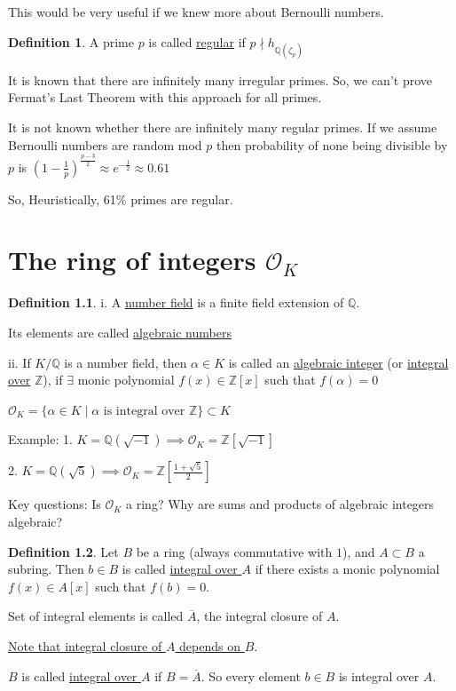 \documentclass[openany]{amsbook}
\numberwithin{section}{chapter}
\theoremstyle{definition}
\newtheorem*{definition}{Definition}
\begin{document}
This would be very useful if we knew more about Bernoulli numbers.

\begin{definition}
    A prime \(p\) is called \underline{regular} if \(p \nmid h_{\mathbb{Q}(\zeta_p)}\) 
\end{definition}

It is known that there are infinitely many irregular primes. So, we can't prove Fermat's Last Theorem with this approach for all primes.

It is not known whether there are infinitely many regular primes. If we assume Bernoulli numbers are random mod \(p\) then probability of none being divisible by \(p\) is \((1 - \frac{1}{p})^{\frac{p-3}{2}} \approx e^{-\frac{1}{2}} \approx 0.61\)

So, Heuristically, 61\% primes are regular.

\chapter{The ring of integers \texorpdfstring{\(\mathcal{O} _K\)}{} }

\begin{definition}
    i. A \underline{number field} is a finite field extension of \(\mathbb{Q} \).
    
    Its elements are called \underline{algebraic numbers}

    ii. If \(K / \mathbb{Q}\) is a number field, then \(\alpha \in K\) is called an \underline{algebraic integer} (or \underline{integral over} \(\mathbb{Z}\)), if \(\exists \) monic polynomial \(f(x) \in \mathbb{Z} [x]\) such that \(f(\alpha ) = 0\)
    
    \(\mathcal{O}_K = \{ \alpha \in K \mid \alpha \text{ is integral over } \mathbb{Z} \} \subset K \) 
\end{definition}

Example: 1. \(K = \mathbb{Q} (\sqrt{-1}) \implies \mathcal{O}_K = \mathbb{Z} [\sqrt{-1}]\)

2. \(K = \mathbb{Q}(\sqrt{5}) \implies \mathcal{O}_K = \mathbb{Z} \left[ \frac{1+\sqrt{5}}{2}\right] \) 

Key questions: Is \(\mathcal{O}_K\) a ring? Why are sums and products of algebraic integers algebraic?

\begin{definition}
    Let \(B\) be a ring (always commutative with \(1\)), and \(A \subset B\) a subring. Then \(b\in B\) is called \underline{integral over \(A\)} if there exists a monic polynomial \(f(x)\in A[x]\) such that \(f(b) = 0\). 

    Set of integral elements is called \(\overline{A}\), the integral closure of \(A\).

    \underline{Note that integral closure of \(A\) depends on \(B\)}.
    
    \(B\) is called \underline{integral over \(A\)} if \(B = \overline{A}\). So every element \(b \in B\) is integral over \(A\).
\end{definition}
\end{document}
